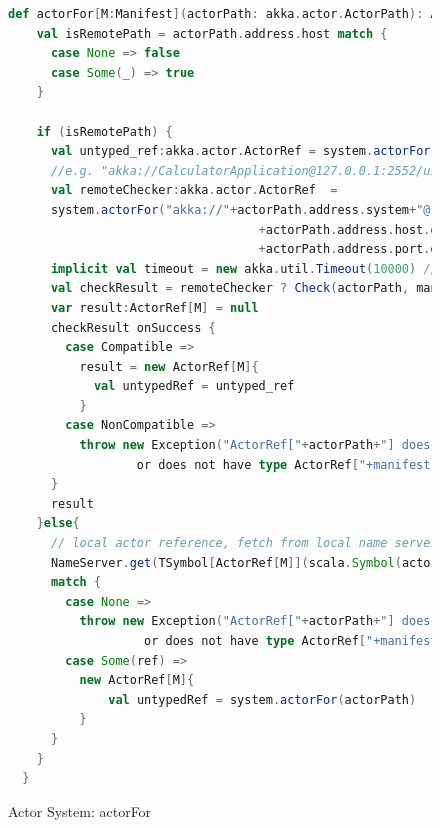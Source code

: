 \begin{figure}[p]

\begin{lstlisting}[language=scala]
def actorFor[M:Manifest](actorPath: akka.actor.ActorPath): ActorRef[M]= {
    val isRemotePath = actorPath.address.host match {
      case None => false
      case Some(_) => true
    }
    
    if (isRemotePath) {
      val untyped_ref:akka.actor.ActorRef = system.actorFor(actorPath)      
      //e.g. "akka://CalculatorApplication@127.0.0.1:2552/user/ActorTypeServer"
      val remoteChecker:akka.actor.ActorRef  = 
      system.actorFor("akka://"+actorPath.address.system+"@"
                                   +actorPath.address.host.get+":"
                                   +actorPath.address.port.get+"/user/ActorTypeServer")
      implicit val timeout = new akka.util.Timeout(10000) // 10 seconds
      val checkResult = remoteChecker ? Check(actorPath, manifest[M]) 
      var result:ActorRef[M] = null
      checkResult onSuccess {
        case Compatible => 
          result = new ActorRef[M]{
            val untypedRef = untyped_ref
          } 
        case NonCompatible => 
          throw new Exception("ActorRef["+actorPath+"] does not exist 
                  or does not have type ActorRef["+manifest[M]+"]")
      }
      result
    }else{
      // local actor reference, fetch from local name server
      NameServer.get(TSymbol[ActorRef[M]](scala.Symbol(actorPath.toString))) 
      match {
        case None => 
          throw new Exception("ActorRef["+actorPath+"] does not exist 
                   or does not have type ActorRef["+manifest[M]+"]")
        case Some(ref) => 
          new ActorRef[M]{
        	  val untypedRef = system.actorFor(actorPath)
          }
      }
    }
  }
\end{lstlisting}
    \caption{Actor System:  actorFor}
    \label{takka_actorFor}
\end{figure}

